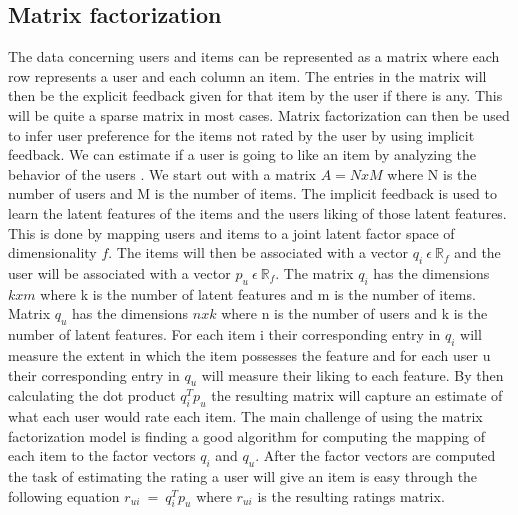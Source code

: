 \subsection{Matrix factorization}
The data concerning users and items can be represented as a matrix where each row represents a user and each column an item.
The entries in the matrix will then be the explicit feedback given for that item by the user if there is any.
This will be quite a sparse matrix in most cases.
Matrix factorization can then be used to infer user preference for the items not rated by the user by using implicit feedback.
We can estimate if a user is going to like an item by analyzing the behavior of the users \cite{Matrix-factorization-techniques}.
We start out with a matrix $A = N x M$ where N is the number of users and M is the number of items.
The implicit feedback is used to learn the latent features of the items and the users liking of those latent features.
This is done by mapping users and items to a joint latent factor space of dimensionality $f$.
The items will then be associated with a vector $q_i \: \epsilon \: \mathbb{R}_f$ and the user will be associated with a vector $p_u \: \epsilon \: \mathbb{R}_f$. 
The matrix $q_i$ has the dimensions $k x m$ where k is the number of latent features and m is the number of items.
Matrix $q_u$ has the dimensions $n x k$ where n is the number of users and k is the number of latent features.
For each item i their corresponding entry in $q_i$ will measure the extent in which the item possesses the feature and for each user u their corresponding entry in $q_u$ will measure their liking to each feature.
By then calculating the dot product $q_i^T p_u$ the resulting matrix will capture an estimate of what each user would rate each item. 
The main challenge of using the matrix factorization model is finding a good algorithm for computing the mapping of each item to the factor vectors $q_i$ and $q_u$.
After the factor vectors are computed the task of estimating the rating a user will give an item is easy through the following equation $r_{ui} \: = \: q_i^T p_u$ where $r_{ui}$ is the resulting ratings matrix.

